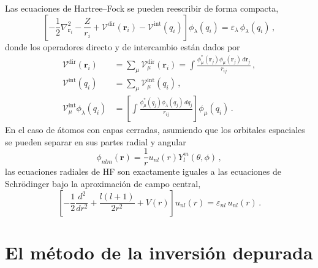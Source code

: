 Las ecuaciones de Hartree--Fock se pueden reescribir de forma compacta, 
\begin{equation}
\left[-\frac{1}{2}\nabla_{\mathbf{r}_i}^2-\frac{Z}{r_i}
+\mathcal{V}^{\mathrm{dir}}(\mathbf{r}_i)
-\mathcal{V}^{\mathrm{int}}(q_i) \right]
\phi_{\lambda}(q_i)=\varepsilon_{\lambda}\,\phi_{\lambda}(q_i)\,,
\label{eq:compactHFeqs}
\end{equation}
donde los operadores directo y de intercambio están dados por
\begin{align}
\mathcal{V}^{\mathrm{dir}}(\mathbf{r}_i) &
=\sum_\mu \mathcal{V}_\mu^{\mathrm{dir}}(\mathbf{r}_i)
=\int\frac{\phi_{\mu}^*(\mathbf{r}_j)\phi_{\mu}(\mathbf{r}_j)\, 
d\mathbf{r}_j}{r_{ij}} \,, \\
\mathcal{V}^{\mathrm{int}}(q_i) 
&=\sum_\mu \mathcal{V}_\mu^{\mathrm{int}}(q_i) \,,\\
\mathcal{V}_\mu^{\mathrm{int}} \phi_{\lambda}(q_i) &= \left[
\int\frac{\phi_{\mu}^*(q_j)\phi_{\lambda}(q_j)\,dq_j}{r_{ij}} \right] 
\phi_\mu(q_i)\,.
\end{align}
En el caso de átomos con capas cerradas, asumiendo que los orbitales 
espaciales se pueden separar en sus partes radial y angular
\begin{equation}
\phi_{nlm}(\mathbf{r})=\frac{1}{r}u_{nl}(r)Y_l^m(\theta,\phi)\,,
\label{eq:centralfield-wave}
\end{equation}
las ecuaciones radiales de HF son exactamente iguales a las ecuaciones 
de Schr\"odinger bajo la aproximación de campo central, 
\begin{equation}
 \left[ -\frac{1}{2}\frac{d^2}{dr^2} + \frac{l(l+1)}{2r^2} +
 V(r) \right] u_{nl}(r) = \varepsilon_{nl} \, u_{nl}(r)\,.
\label{eq:eqSchroRadial}
\end{equation}


\section{El método de la inversión depurada}
\label{sec:dimatomos}

